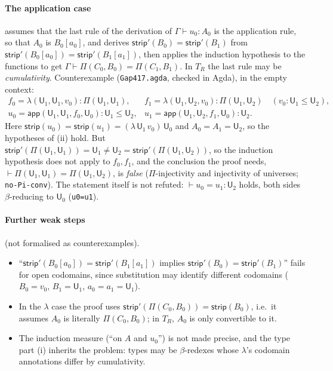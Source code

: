 \documentclass[10pt]{article}
\newcommand{\U}{\mathsf{U}}
\newcommand{\lam}{\lambda}
\newcommand{\app}{\mathsf{app}}
\newcommand{\strip}{\mathsf{strip}}
\newcommand{\TR}{T_R}
\newcommand{\agda}[1]{\texttt{#1}}
\theoremstyle{remark}
\begin{document}
\paragraph{The application case} assumes that the last rule of the derivation
of $\Gamma\vdash u_0:A_0$ is the application rule, so that $A_0$ is
$B_0[a_0]$, and derives $\strip'(B_0)=\strip'(B_1)$ from
$\strip'(B_0[a_0])=\strip'(B_1[a_1])$, then applies the induction hypothesis
to the functions to get $\Gamma\vdash\Pi(C_0,B_0)=\Pi(C_1,B_1)$.  In $\TR$
the last rule may be \emph{cumulativity}.  Counterexample
(\agda{Gap417.agda}, checked in Agda), in the empty context:
\[
\begin{array}{ll}
f_0=\lam(\U_1,\U_1,v_0):\Pi(\U_1,\U_1), &
f_1=\lam(\U_1,\U_2,v_0):\Pi(\U_1,\U_2)\quad(v_0:\U_1\le\U_2),\\[2pt]
u_0=\app(\U_1,\U_1,f_0,\U_0):\U_1\le\U_2, &
u_1=\app(\U_1,\U_2,f_1,\U_0):\U_2 .
\end{array}
\]
Here $\strip(u_0)=\strip(u_1)=(\lam\,\U_1\,v_0)\,\U_0$ and
$A_0=A_1=\U_2$, so the hypotheses of (ii) hold.  But
$\strip'(\Pi(\U_1,\U_1))=\U_1\ne\U_2=\strip'(\Pi(\U_1,\U_2))$, so the
induction hypothesis does not apply to $f_0,f_1$, and the conclusion the
proof needs, $\vdash\Pi(\U_1,\U_1)=\Pi(\U_1,\U_2)$, is \emph{false}
($\Pi$-injectivity and injectivity of universes; \agda{no-Pi-conv}).
The statement itself is not refuted: $\vdash u_0=u_1:\U_2$ holds, both sides
$\beta$-reducing to $\U_0$ (\agda{u0=u1}).

\paragraph{Further weak steps} (not formalised as counterexamples).
\begin{itemize}
\item ``$\strip'(B_0[a_0])=\strip'(B_1[a_1])$ implies $\strip'(B_0)=\strip'(B_1)$''
  fails for open codomains, since substitution may identify different
  codomains ($B_0=v_0$, $B_1=\U_1$, $a_0=a_1=\U_1$).
\item In the $\lam$ case the proof uses
  $\strip'(\Pi(C_0,B_0))=\strip(B_0)$, i.e.\ it assumes $A_0$ is literally
  $\Pi(C_0,B_0)$; in $\TR$, $A_0$ is only convertible to it.
\item The induction measure (``on $A$ and $u_0$'') is not made precise, and
  the type part (i) inherits the problem: types may be $\beta$-redexes whose
  $\lam$'s codomain annotations differ by cumulativity.
\end{itemize}
\end{document}
